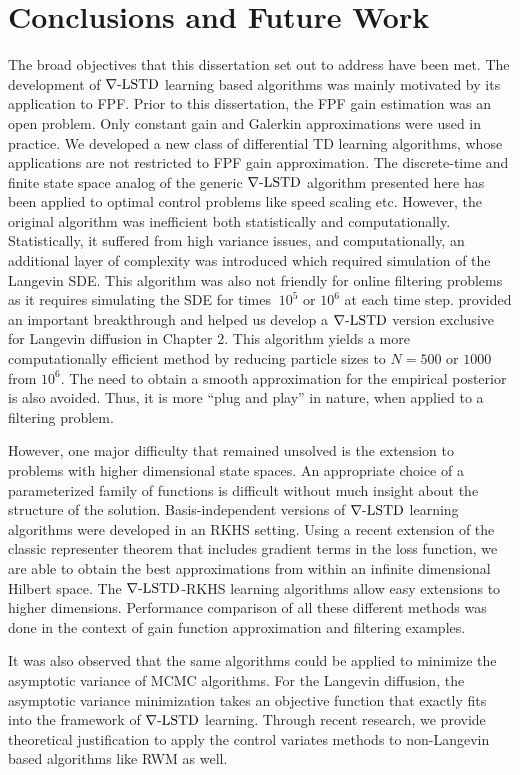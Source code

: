 \chapter{Conclusions and Future Work}
\label{ch:conclusions}
The broad objectives that this dissertation set out to address have been met. The development of $\nabla\text{-LSTD}$ learning based algorithms was mainly motivated by its application to FPF. Prior to this dissertation, the FPF gain estimation was an open problem. Only constant gain and Galerkin approximations were used in practice. We developed a new class of differential TD learning algorithms, whose applications are not restricted to FPF gain approximation. The discrete-time and finite state space analog of the generic $\nabla\text{-LSTD}$ algorithm presented here has been applied to optimal control problems like speed scaling etc. However, the original algorithm was inefficient both statistically and computationally. Statistically, it suffered from high variance issues, and computationally, an additional layer of complexity was introduced which required simulation of the Langevin SDE. This algorithm was also not friendly for online filtering problems as it requires simulating the SDE for times $~10^5$ or $10^6$ at each time step.  provided an important breakthrough and helped us develop a $\nabla\text{-LSTD}$ version exclusive for Langevin diffusion in Chapter 2. This algorithm yields a more computationally efficient method by reducing particle sizes to $N=500$ or $1000$ from $10^6$. The need to obtain a smooth approximation for the empirical posterior is also avoided. Thus, it is more ``plug and play'' in nature, when applied to a filtering problem.  

However, one major difficulty that remained unsolved is the extension to problems with higher dimensional state spaces. An appropriate choice of a parameterized family of functions is difficult without much insight about the structure of the solution. Basis-independent versions of $\nabla\text{-LSTD}$ learning algorithms were developed in an RKHS setting. Using a recent extension of the classic representer theorem that includes gradient terms in the loss function, we are able to obtain the best approximations from within an infinite dimensional Hilbert space. The $\nabla\text{-LSTD}$-RKHS learning algorithms allow easy extensions to higher dimensions. Performance comparison of all these different methods was done in the context of gain function approximation and filtering examples. 

It was also observed that the same algorithms could be applied to minimize the asymptotic variance of MCMC algorithms. For the Langevin diffusion, the asymptotic variance minimization takes an objective function that exactly fits into the framework of $\nabla\text{-LSTD}$ learning. Through recent research, we provide theoretical justification to apply the control variates methods to non-Langevin based algorithms like RWM as well. 

